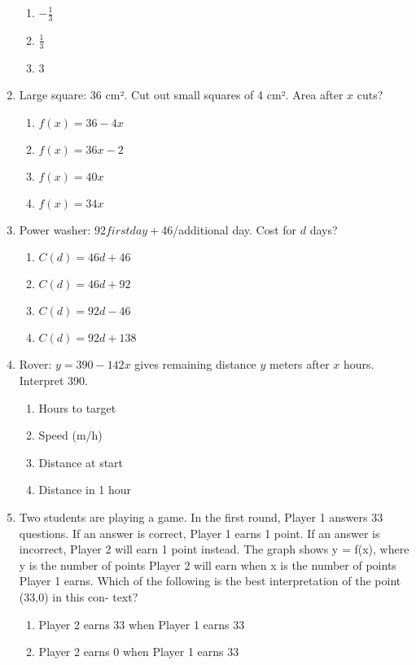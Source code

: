 \documentclass[12pt]{exam}
\begin{document}
\begin{enumerate}
\begin{enumerate}[label=\Alph*)]
        \item $-\frac{1}{3}$
        \item $\frac{1}{3}$
        \item 3
    \end{enumerate}
    \item Large square: 36 cm². Cut out small squares of 4 cm². Area after $x$ cuts?
    \begin{enumerate}[label=\Alph*)]
        \item $f(x) = 36 - 4x$
        \item $f(x) = 36x - 2$
        \item $f(x) = 40x$
        \item $f(x) = 34x$
    \end{enumerate}
    \item Power washer: $92 first day + $46/additional day. Cost for $d$ days?
    \begin{enumerate}[label=\Alph*)]
        \item $C(d) = 46d + 46$
        \item $C(d) = 46d + 92$
        \item $C(d) = 92d - 46$
        \item $C(d) = 92d + 138$
    \end{enumerate}
    \item Rover: $y = 390 - 142x$ gives remaining distance $y$ meters after $x$ hours. Interpret 390.
    \begin{enumerate}[label=\Alph*)]
        \item Hours to target
        \item Speed (m/h)
        \item Distance at start
        \item Distance in 1 hour
    \end{enumerate}
    \item Two students are playing a game. In the
first round, Player 1 answers 33 questions. If
an answer is correct, Player 1 earns 1 point.
If an answer is incorrect, Player 2 will earn
1 point instead. The graph shows y = f(x),
where y is the number of points Player 2 will
earn when x is the number of points Player
1 earns. Which of the following is the best
interpretation of the point (33,0) in this con-
text?
    \begin{enumerate}[label=\Alph*)]
        \item Player 2 earns 33 when Player 1 earns 33
        \item Player 2 earns 0 when Player 1 earns 33

\end{enumerate}
\end{enumerate}
\end{document}
